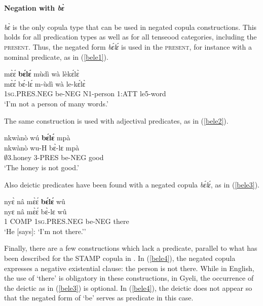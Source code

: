 \paragraph{Negation with {\itshape bɛ̀}}
{\itshape bɛ̀} is the only copula type that can be used in negated copula constructions. This holds for all predication types as well as for all tenseood categories, including the \textsc{present}. Thus, the negated form {\itshape bɛ́lɛ́} is used in the \textsc{present}, for instance with a nominal predicate, as in (\ref{bele1}).

\begin{exe} 
\ex\label{bele1}
  \glll  mɛ̀ɛ́ {\bfseries bɛ́lɛ́} mùdì wà lèkɛ́lɛ̀ \\
         mɛ̀ɛ́ bɛ́-lɛ́ m-ùdì wà le-kɛ́lɛ̀ \\
          1\textsc{sg}.PRES.NEG be-NEG N1-person 1:ATT le5-word  \\
    \trans `I'm not a person of many words.'
\end{exe}

\noindent The same construction is used with adjectival predicates, as in (\ref{bele2}).

\begin{exe} 
\ex\label{bele2}
  \glll nkwànò wú {\bfseries bɛ́lɛ́} mpà \\
       nkwànò wu-H bɛ̀-lɛ mpà \\
       $\emptyset$3.honey 3-PRES be-NEG good  \\
    \trans `The honey is not good.'
\end{exe}

\noindent Also deictic predicates have been found with a negated copula {\itshape bɛ́lɛ́}, as in (\ref{bele3}).


\begin{exe} 
\ex\label{bele3}
  \glll nyɛ̀ nâ mɛ̀ɛ́ {\bfseries bɛ́lɛ́} wû \\
       nyɛ nâ mɛ̀ɛ́ bɛ̀-lɛ wû \\
        1 COMP 1\textsc{sg}.PRES.NEG be-NEG there \\
    \trans `He [says]: `I'm not there.''
\end{exe}

\noindent Finally, there are a few constructions which lack a predicate, parallel to what has been described for the STAMP copula in . In (\ref{bele4}), the negated copula expresses a negative existential clause: the person is not there. While in English, the use of `there' is obligatory in these constructions, in Gyeli, the occurrence of the deictic as in (\ref{bele3}) is optional. In (\ref{bele4}), the deictic does not appear so that the negated form of `be' serves as predicate in this case.

